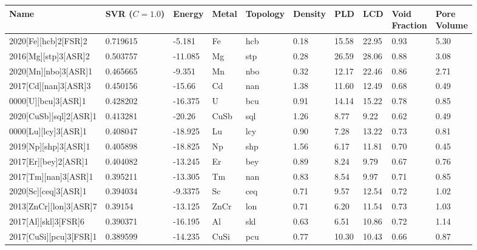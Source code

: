\documentclass[twoside,twocolumn,9pt]{article}
\begin{document}
\begin{table}[t]
	\centering
	\begin{tabular}{@{}llllllllll@{}}
		\toprule
		\textbf{Name} &
		\makecell{\textbf{SVR}\\\textbf{($C=1.0$)}} &
		\textbf{Energy} &
		\textbf{Metal} &
		\textbf{Topology} &
		\textbf{Density} &
		\textbf{PLD} &
		\textbf{LCD} &
		\makecell{\textbf{Void}\\\textbf{Fraction}} &
		\makecell{\textbf{Pore}\\\textbf{Volume}} \\
		\midrule
		2020{[}Fe{]}{[}hcb{]}2{[}FSR{]}2   & 0.719615 & -5.181  & Fe   & hcb & 0.18 & 15.58 & 22.95 & 0.93 & 5.30 \\
		2016{[}Mg{]}{[}stp{]}3{[}ASR{]}2   & 0.503757 & -11.085 & Mg   & stp & 0.28 & 26.59 & 28.06 & 0.88 & 3.08 \\
		2020{[}Mn{]}{[}nbo{]}3{[}ASR{]}1   & 0.465665 & -9.351  & Mn   & nbo & 0.32 & 12.17 & 22.46 & 0.86 & 2.71 \\
		2017{[}Cd{]}{[}nan{]}3{[}ASR{]}3   & 0.450156 & -15.66  & Cd   & nan & 1.38 & 11.60 & 12.49 & 0.68 & 0.49 \\
		0000{[}U{]}{[}bcu{]}3{[}ASR{]}1    & 0.428202 & -16.375 & U    & bcu & 0.91 & 14.14 & 15.22 & 0.78 & 0.85 \\
		2020{[}CuSb{]}{[}sql{]}2{[}ASR{]}1 & 0.413281 & -20.26  & CuSb & sql & 1.26 & 8.77  & 9.22  & 0.62 & 0.49 \\
		0000{[}Lu{]}{[}lcy{]}3{[}ASR{]}1   & 0.408047 & -18.925 & Lu   & lcy & 0.90 & 7.28  & 13.22 & 0.73 & 0.81 \\
		2019{[}Np{]}{[}shp{]}3{[}ASR{]}1   & 0.405898 & -18.825 & Np   & shp & 1.56 & 6.17  & 11.81 & 0.70 & 0.45 \\
		2017{[}Er{]}{[}bey{]}2{[}ASR{]}1   & 0.404082 & -13.245 & Er   & bey & 0.89 & 8.24  & 9.79  & 0.67 & 0.76 \\
		2017{[}Tm{]}{[}nan{]}3{[}ASR{]}1   & 0.395211 & -13.305 & Tm   & nan & 0.83 & 8.54  & 9.97  & 0.71 & 0.85 \\
		2020{[}Sc{]}{[}ceq{]}3{[}ASR{]}1   & 0.394034 & -9.3375 & Sc   & ceq & 0.71 & 9.57  & 12.54 & 0.72 & 1.02 \\
		2013{[}ZnCr{]}{[}lon{]}3{[}ASR{]}7 & 0.39154  & -13.125 & ZnCr & lon & 0.71 & 6.20  & 11.54 & 0.73 & 1.03 \\
		2017{[}Al{]}{[}skl{]}3{[}FSR{]}6   & 0.390371 & -16.195 & Al   & skl & 0.63 & 6.51  & 10.86 & 0.72 & 1.14 \\
		2017{[}CuSi{]}{[}pcu{]}3{[}FSR{]}1 & 0.389599 & -14.235 & CuSi & pcu & 0.77 & 10.30 & 10.43 & 0.66 & 0.87 \\

\end{tabular}
\end{table}
\end{document}
